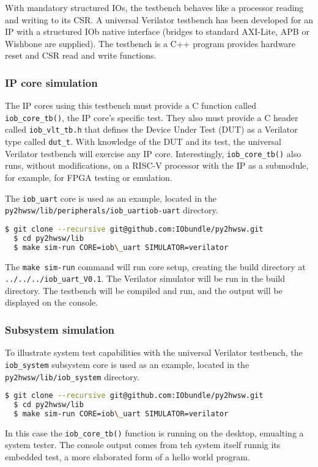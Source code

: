 %

With mandatory structured IOs, the testbench behaves like a processor reading
and writing to its CSR. A universal Verilator testbench has been developed for
an IP with a structured IOb native interface (bridges to standard AXI-Lite, APB
or Wishbone are supplied). The testbench is a C++ program provides hardware
reset and CSR read and write functions.

\subsubsection{IP core simulation}

The IP cores using this testbench must provide a C function called
{\tt iob\_core\_tb()}, the IP core’s specific test. They also must provide a C header
called {\tt iob\_vlt\_tb.h} that defines the Device Under Test (DUT) as a Verilator
type called {\tt dut\_t}. With knowledge of the DUT and its test, the universal
Verilator testbench will exercise any IP core. Interestingly, {\tt iob\_core\_tb()} also
runs, without modifications, on a RISC-V processor with the IP as a submodule,
for example, for FPGA testing or emulation.

The {\tt iob\_uart} core is used as an example, located in the {\tt
  py2hwsw/lib/peripherals/iob\_uartiob-uart} directory.

\begin{lstlisting}[language=bash]
  $ git clone --recursive git@github.com:IObundle/py2hwsw.git
  $ cd py2hwsw/lib
  $ make sim-run CORE=iob\_uart SIMULATOR=verilator
\end{lstlisting}

The {\tt make sim-run} command will run core setup, creating the build directory
at {\tt ../../../iob\_uart\_V0.1}. The Verilator simulator will be run in the
build directory. The testbench will be compiled and run, and the output will be
displayed on the console.

\subsubsection{Subsystem simulation}

To illustrate system test capabilities with the universal Verilator testbench,
the {\tt iob\_system} subsystem core is used as an example, located in the {\tt
  py2hwsw/lib/iob\_system} directory.

\begin{lstlisting}[language=bash]
  $ git clone --recursive git@github.com:IObundle/py2hwsw.git
  $ cd py2hwsw/lib
  $ make sim-run CORE=iob\_uart SIMULATOR=verilator
\end{lstlisting}

In this case the {\tt iob\_core\_tb()} function is running on the desktop,
emualting a system tester. The console output comes from teh system itself
runnig its embedded test, a more elaborated form of a hello world program.
